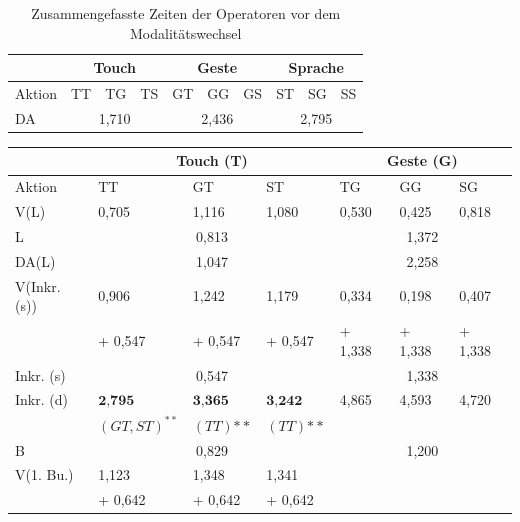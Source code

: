 \begin{table}[ht]
  \centering
	\begin{tabular}{|l|l|l|l|l|l|l|l|l|l|}
		\hline
		& \multicolumn{3}{|c|}{Touch} & \multicolumn{3}{|c|}{Geste}&\multicolumn{3}{|c|}{Sprache}\\
		\hline
		Aktion 					& TT 		& TG 		& TS 		& GT 		& GG 		& GS 		& ST 		& SG 		& SS\\
		\hline
		DA 	& \multicolumn{3}{|c|}{1,710} &	\multicolumn{3}{|c|}{2,436} 	&	\multicolumn{3}{|c|}{2,795} \\
		\hline
  \end{tabular}
	\caption{Zusammengefasste Zeiten der Operatoren vor dem Modalitätswechsel}
\label{tab:OperatorzeitenZusammengefasst1}
\end{table}
\begin{table}[ht]
  \centering
	\begin{tabular}{|l|l|l|l|l|l|l|}
		\hline
		& \multicolumn{3}{|c|}{Touch (T)} & \multicolumn{3}{|c|}{Geste (G)}\\
		\hline
		Aktion 					& TT 	& GT 	& ST 	& TG 	& GG 	& SG \\
		\hline
		V(L)	& {0,705} 	& {1,116}		& {1,080} 	&	{0,530}		&	{0,425}		&	{0,818}\\
		\hline
		L					& \multicolumn{3}{|c|}{0,813} &	\multicolumn{3}{|c|}{1,372}\\
		\hline
		DA(L)			& \multicolumn{3}{|c|}{1,047} &	\multicolumn{3}{|c|}{2,258}\\
		\hline
		V(Inkr. (s))
										& {0,906} 	& {1,242}		& {1,179} 	&	{0,334}		&	{0,198}		&	{0,407}\\
										& \small{+ 0,547} 	& \small{+ 0,547}	& \tiny{+ 0,547} 	&	\small{+ 1,338}	&	\tiny{+ 1,338}	&	\small{+ 1,338}\\
		\hline
		Inkr. (s)				& \multicolumn{3}{|c|}{0,547} &	\multicolumn{3}{|c|}{1,338}\\
		\hline
		Inkr. (d)				& $\textbf{2,795}$ & $\textbf{3,365}$	& $\textbf{3,242}$ &	4,865	&	4,593	&	4,720	\\
									& \small{$(GT,ST)^{**}$} & \small{$(TT){**}$}	& \small{$(TT){**}$}  &	&	&		 \\
		\hline
		B 				& \multicolumn{3}{|c|}{0,829} &	\multicolumn{3}{|c|}{1,200}\\
		\hline
		V(1. Bu.)
										& {1,123} 	& {1,348}		& {1,341} 	&				& 			&  	\\
										& \small{+ 0,642} & \small{+ 0,642}	& \small{+ 0,642} &				& 			&  		\\

\end{tabular}
\end{table}
